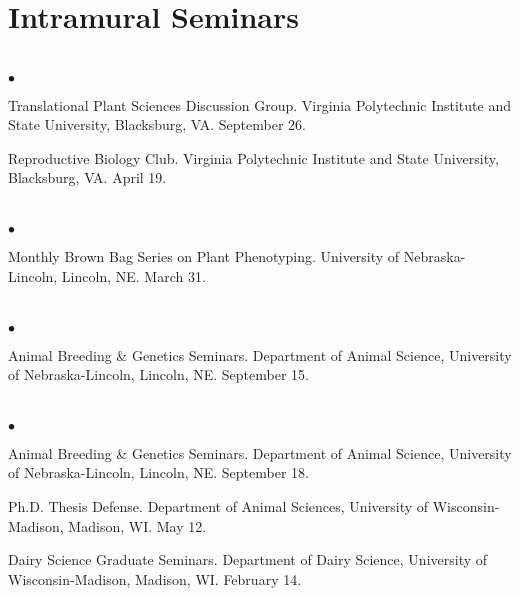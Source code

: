 \documentclass[margin,line,10pt]{res}
\newenvironment{list2}{
  \begin{list}{$\bullet$}{%
      \setlength{\itemsep}{0in}
      \setlength{\parsep}{0in} \setlength{\parskip}{0in}
      \setlength{\topsep}{0in} \setlength{\partopsep}{0in} 
      \setlength{\leftmargin}{0.2in}}}{\end{list}}
\begin{document}
\begin{resume}
\vspace{0.5cm}
\section{\sc Intramural Seminars}
\vspace{1cm}
\section{}
\begin{list2}
  \item Translational Plant Sciences Discussion Group. Virginia Polytechnic Institute and State University, Blacksburg, VA. September 26. 
  \vspace{0.25cm}
\item Reproductive Biology Club. Virginia Polytechnic Institute and State University, Blacksburg, VA. April 19. 
\end{list2}  
\section{}
\begin{list2}
\item Monthly Brown Bag Series on Plant Phenotyping. University of Nebraska-Lincoln, Lincoln, NE. March 31. 
\end{list2}  
\section{}
\begin{list2}
\item  Animal Breeding \& Genetics Seminars. Department of Animal Science, University of Nebraska-Lincoln, Lincoln, NE. September 15. 
\end{list2}  
\section{}
\begin{list2}
\item  Animal Breeding \& Genetics Seminars. Department of Animal Science, University of Nebraska-Lincoln, Lincoln, NE. September 18. 
\vspace{0.25cm}
\item  Ph.D. Thesis Defense. Department of Animal Sciences, University of Wisconsin-Madison, Madison, WI. May 12. 
\vspace{0.25cm}
\item  Dairy Science Graduate Seminars. Department of Dairy Science, University of Wisconsin-Madison, Madison, WI. February 14. 
\end{list2}  

\end{resume}
\end{document}
